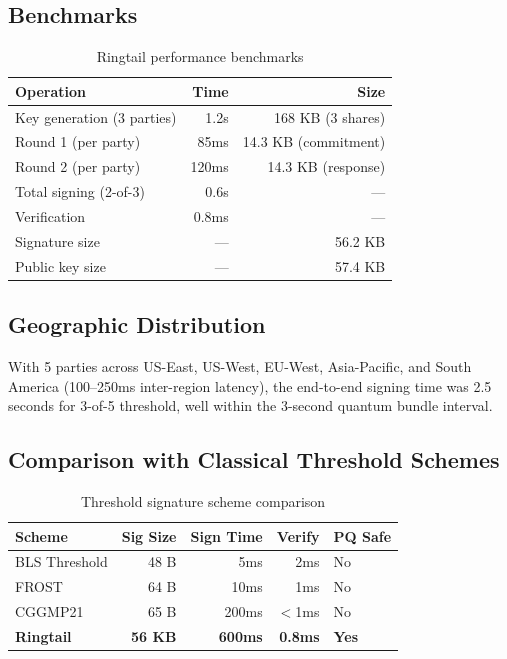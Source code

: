 \documentclass[11pt,a4paper]{article}
\begin{document}
\subsection{Benchmarks}

\begin{table}[h]
\centering
\begin{tabular}{@{}lrr@{}}
\toprule
\textbf{Operation} & \textbf{Time} & \textbf{Size} \\
\midrule
Key generation (3 parties) & 1.2s & 168 KB (3 shares) \\
Round 1 (per party) & 85ms & 14.3 KB (commitment) \\
Round 2 (per party) & 120ms & 14.3 KB (response) \\
Total signing (2-of-3) & 0.6s & --- \\
Verification & 0.8ms & --- \\
Signature size & --- & 56.2 KB \\
Public key size & --- & 57.4 KB \\
\bottomrule
\end{tabular}
\caption{Ringtail performance benchmarks}
\label{tab:benchmarks}
\end{table}

\subsection{Geographic Distribution}

With 5 parties across US-East, US-West, EU-West, Asia-Pacific, and South America
(100--250ms inter-region latency), the end-to-end signing time was 2.5 seconds for
3-of-5 threshold, well within the 3-second quantum bundle interval.

\subsection{Comparison with Classical Threshold Schemes}

\begin{table}[h]
\centering
\begin{tabular}{@{}lrrrl@{}}
\toprule
\textbf{Scheme} & \textbf{Sig Size} & \textbf{Sign Time} & \textbf{Verify} & \textbf{PQ Safe} \\
\midrule
BLS Threshold & 48 B & 5ms & 2ms & No \\
FROST & 64 B & 10ms & 1ms & No \\
CGGMP21 & 65 B & 200ms & $<$1ms & No \\
\textbf{Ringtail} & \textbf{56 KB} & \textbf{600ms} & \textbf{0.8ms} & \textbf{Yes} \\
\bottomrule
\end{tabular}
\caption{Threshold signature scheme comparison}
\label{tab:comparison}
\end{table}
\end{document}
